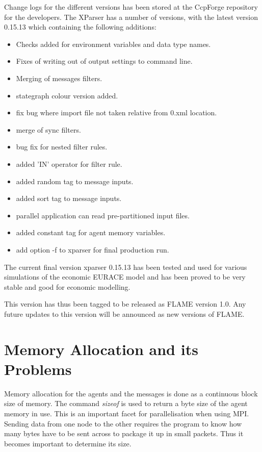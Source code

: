 Change logs for the different versions has been stored at the CcpForge repository for the developers. The XParser has a number of versions, with the latest version 0.15.13 which containing the following additions:
\begin{itemize}
\item Checks added for environment variables and data type names.
\item Fixes of writing out of output settings to command line.
\item Merging of messages filters.
\item	 stategraph colour version added.
\item	 fix bug where import file not taken relative from 0.xml location.
\item	 merge of sync filters.
\item	 bug fix for nested filter rules.
\item added 'IN' operator for filter rule.
\item added random tag to message inputs.
\item added sort tag to message inputs.
\item parallel application can read pre-partitioned input files.
\item added constant tag for agent memory variables.
\item add option -f to xparser for final production run.
\end{itemize}

The current final version xparser 0.15.13 has been tested and used for various simulations of the economic EURACE model and has been proved to be very stable and good for economic modelling.

This version has thus been tagged to be released as FLAME version 1.0. Any future updates to this version will be announced as new versions of FLAME.
 
\section{Memory Allocation and its Problems}

Memory allocation for the agents and the messages is done as a continuous block size of memory.
The command \emph{sizeof} is used to return a byte size of the agent memory in use.
This is an important facet for parallelisation when using MPI. Sending data from one node to the other requires the program to know how many bytes have to be sent across to package it up in small packets. Thus it becomes important to determine its size.

